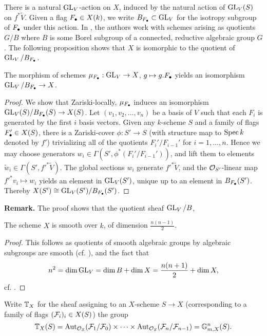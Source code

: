 \documentclass[../main.tex]{subfiles}
\begin{document}
There is a natural $\operatorname{GL}_V$-action on $X$, induced by the natural action of 
$\operatorname{GL}_V(S)$ on $f^* \tilde V$. Given a flag $F_\bullet \in
X(k)$, we write $B_{F_\bullet} \subset \operatorname{GL}_V$ for the isotropy subgroup of $F_\bullet$
under this action. In \cite{delignelusztig1976}, the authors work with schemes
arising as quotients $G/B$ where $B$ is some Borel subgroup of a connected, reductive
algebraic group $G$. 
The following proposition shows that $X$ is isomorphic to the quotient of 
$\operatorname{GL}_V/B_{F_\bullet}$.

\begin{prop}\label{prop:FlagVarietyAsQuotient}
  The morphism of schemes $\mu_{F_\bullet}: \operatorname{GL}_V \to X$, $g \mapsto g.F_\bullet$
  yields an isomorphism $\operatorname{GL}_V/B_{F_\bullet} \to X$. 
\begin{proof}
  We show that Zariski-locally, $\mu_{F_\bullet}$ induces an isomorphism 
  $\operatorname{GL}_V(S)/B_{F_\bullet}(S) \to X(S)$.
  Let $(v_1, v_2, \dots, v_n)$ be a basis of $V$ such that each $F_i$ is generated
  by the first $i$ basis vectors. 
  Given any $k$-scheme $S$ and a family of flags $F_\bullet' \in X(S)$, 
  there is a Zariski-cover $\phi: S' \to S$ (with structure map to $\operatorname{Spec} k$ denoted
  by $f'$) trivializing all of the quotients $F_i'/F_{i-1}'$ for $i = 1, \dots,
  n$. Hence we may choose generators $w_i \in \Gamma(S', \phi^*(F_i'/F_{i-1}'))$,
  and lift them to elements $\tilde w_i \in \Gamma(S', f'^* \tilde V)$. The 
  global sections $w_i$ generate $f'^* \tilde V$, and the $\mathcal{O}_{S'}$-linear
  map $f'^* v_i \mapsto w_i$ yields an element in $\operatorname{GL}_V(S')$, unique up to 
  an element in $B_{F_\bullet}(S')$. Thereby $X(S') \cong \operatorname{GL}_V(S')/B_{F_\bullet}(S')$.
\end{proof}
\end{prop}

\textbf{Remark. }The proof shows that the quotient sheaf $\operatorname{GL}_V/B$, 

\begin{cor}\label{cor:XisSmoothAndOfDimension}
  The scheme $X$ is smooth over $k$, of dimension $\frac{n(n-1)}2$. 
\begin{proof}
  This follows as quotients of smooth algebraic groups by algebraic subgroups are 
  smooth (cf. \cite[Corollary 5.26]{milne2017algebraic}), and the fact that 
  $$n^2 = \dim \operatorname{GL}_V = \dim B + \dim X = \frac{n(n+1)}2 + \dim X,$$
  cf. \cite[Proposition 5.23]{milne2017algebraic}. 
\end{proof}
\end{cor}

Write $\mathbb{T}_X$ for the sheaf assigning to an $X$-scheme $S \to X$ (corresponding
to a  family of flags $(\mathcal{F}_i)_i \in X(S)$) the group 
$$\mathbb{T}_X(S) = \operatorname{Aut}_{\mathcal{O}_S}(\mathcal{F}_1/\mathcal{F}_0) \times \dots \times \operatorname{Aut}_{\mathcal{O}_S}(\mathcal{F}_n/\mathcal{F}_{n-1}) 
= \mathbb{G}_{m,X}^n(S).$$
\end{document}
